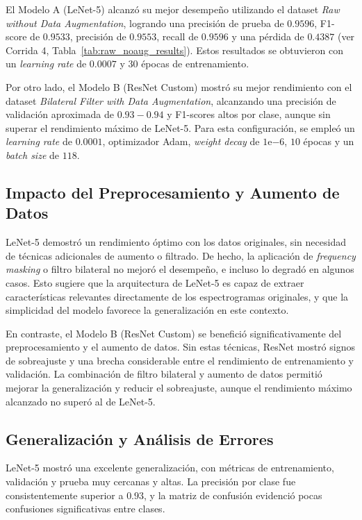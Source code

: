 \documentclass[conference]{IEEEtran}
\begin{document}
El Modelo A (LeNet-5) alcanzó su mejor desempeño utilizando el dataset \textit{Raw without Data Augmentation}, logrando una precisión de prueba de \(0.9596\), F1-score de \(0.9533\), precisión de \(0.9553\), recall de \(0.9596\) y una pérdida de \(0.4387\) (ver Corrida 4, Tabla~\ref{tab:raw_noaug_results}). Estos resultados se obtuvieron con un \textit{learning rate} de \(0.0007\) y \(30\) épocas de entrenamiento.

Por otro lado, el Modelo B (ResNet Custom) mostró su mejor rendimiento con el dataset \textit{Bilateral Filter with Data Augmentation}, alcanzando una precisión de validación aproximada de \(0.93-0.94\) y F1-scores altos por clase, aunque sin superar el rendimiento máximo de LeNet-5. Para esta configuración, se empleó un \textit{learning rate} de \(0.0001\), optimizador Adam, \textit{weight decay} de \(1\mathrm{e}{-6}\), \(10\) épocas y un \textit{batch size} de \(118\).

\subsection{Impacto del Preprocesamiento y Aumento de Datos}

LeNet-5 demostró un rendimiento óptimo con los datos originales, sin necesidad de técnicas adicionales de aumento o filtrado. De hecho, la aplicación de \textit{frequency masking} o filtro bilateral no mejoró el desempeño, e incluso lo degradó en algunos casos. Esto sugiere que la arquitectura de LeNet-5 es capaz de extraer características relevantes directamente de los espectrogramas originales, y que la simplicidad del modelo favorece la generalización en este contexto.

En contraste, el Modelo B (ResNet Custom) se benefició significativamente del preprocesamiento y el aumento de datos. Sin estas técnicas, ResNet mostró signos de sobreajuste y una brecha considerable entre el rendimiento de entrenamiento y validación. La combinación de filtro bilateral y aumento de datos permitió mejorar la generalización y reducir el sobreajuste, aunque el rendimiento máximo alcanzado no superó al de LeNet-5.

\subsection{Generalización y Análisis de Errores}

LeNet-5 mostró una excelente generalización, con métricas de entrenamiento, validación y prueba muy cercanas y altas. La precisión por clase fue consistentemente superior a \(0.93\), y la matriz de confusión evidenció pocas confusiones significativas entre clases.
\end{document}
